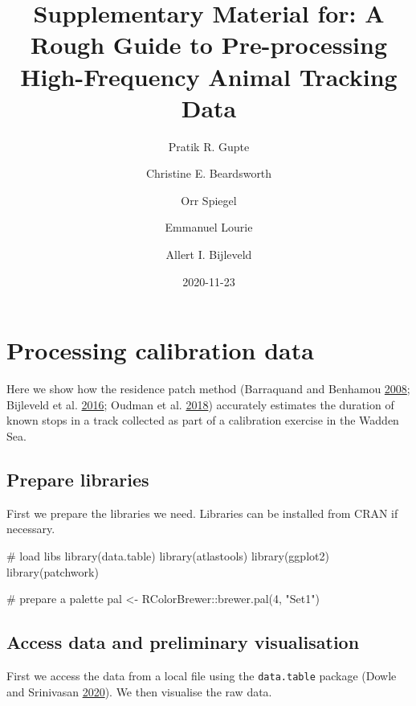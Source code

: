 \documentclass[]{scrreprt}
\title{Supplementary Material for: A Rough Guide to Pre-processing High-Frequency Animal Tracking Data}
\author{Pratik R. Gupte \and Christine E. Beardsworth \and Orr Spiegel \and Emmanuel Lourie \and Allert I. Bijleveld}
\date{2020-11-23}
\newenvironment{Shaded}{}{}
\newcommand{\CommentTok}[1]{\textcolor[rgb]{0.00,0.50,0.00}{#1}}
\newcommand{\DecValTok}[1]{#1}
\newcommand{\KeywordTok}[1]{\textcolor[rgb]{0.00,0.00,1.00}{#1}}
\newcommand{\NormalTok}[1]{#1}
\newcommand{\OperatorTok}[1]{#1}
\newcommand{\StringTok}[1]{\textcolor[rgb]{0.00,0.50,0.50}{#1}}
\begin{document}
\maketitle

{
\setcounter{tocdepth}{1}
\tableofcontents
}
\hypertarget{processing-calibration-data}{%
\chapter{Processing calibration data}\label{processing-calibration-data}}

Here we show how the residence patch method (Barraquand and Benhamou \protect\hyperlink{ref-barraquand2008}{2008}; Bijleveld et al. \protect\hyperlink{ref-bijleveld2016}{2016}; Oudman et al. \protect\hyperlink{ref-oudman2018}{2018}) accurately estimates the duration of known stops in a track collected as part of a calibration exercise in the Wadden Sea.

\hypertarget{prepare-libraries}{%
\section{Prepare libraries}\label{prepare-libraries}}

First we prepare the libraries we need. Libraries can be installed from CRAN if necessary.

\begin{Shaded}
\begin{Highlighting}[]
\CommentTok{# load libs}
\KeywordTok{library}\NormalTok{(data.table)}
\KeywordTok{library}\NormalTok{(atlastools)}
\KeywordTok{library}\NormalTok{(ggplot2)}
\KeywordTok{library}\NormalTok{(patchwork)}

\CommentTok{# prepare a palette}
\NormalTok{pal <-}\StringTok{ }\NormalTok{RColorBrewer}\OperatorTok{::}\KeywordTok{brewer.pal}\NormalTok{(}\DecValTok{4}\NormalTok{, }\StringTok{"Set1"}\NormalTok{)}
\end{Highlighting}
\end{Shaded}

\hypertarget{access-data-and-preliminary-visualisation}{%
\section{Access data and preliminary visualisation}\label{access-data-and-preliminary-visualisation}}

First we access the data from a local file using the \texttt{data.table} package (Dowle and Srinivasan \protect\hyperlink{ref-dowle2020}{2020}).
We then visualise the raw data.
\end{document}
